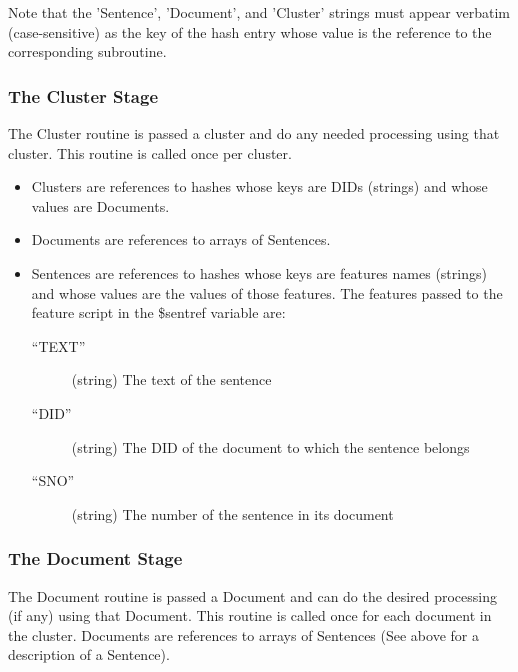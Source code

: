 \documentclass[10pt]{article}
\begin{document}
Note that the 'Sentence', 'Document', and 'Cluster' strings must 
appear verbatim (case-sensitive)
as the key of the hash entry whose value is the reference to the
corresponding subroutine.

\subsubsection{The Cluster Stage}

The Cluster routine is passed a cluster and do any needed
processing using that cluster.  This routine is called once per cluster.

\begin{itemize}

\item Clusters are references to hashes whose keys are DIDs (strings)
and whose values are Documents.

\item Documents are references to arrays of Sentences.

\item Sentences are references to hashes whose keys are features
names (strings) and whose
values are the values of those features.  The features passed to
the feature script in the \$sentref variable are:

\begin{description}

\item[``TEXT''] (string) The text of the sentence

\item[``DID''] (string) The DID of the document to which the sentence belongs

\item[``SNO''] (string) The number of the sentence in its document

\end{description}

\end{itemize}

\subsubsection{The Document Stage}

The Document routine is passed a Document and can do the desired
processing (if any) using that Document.  This routine is
called once for each document in the cluster.
Documents are references to arrays of Sentences 
(See above for a description of a Sentence).
\end{document}
